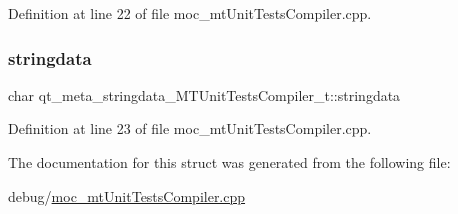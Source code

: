 Definition at line 22 of file moc\+\_\+mt\+Unit\+Tests\+Compiler.\+cpp.

\mbox{\label{structqt__meta__stringdata___m_t_unit_tests_compiler__t_a86fa0a4aa69d55de8577922974d0aea5}} 
\subsubsection{\texorpdfstring{stringdata}{stringdata}}
{\footnotesize\ttfamily char qt\+\_\+meta\+\_\+stringdata\+\_\+\+M\+T\+Unit\+Tests\+Compiler\+\_\+t\+::stringdata}



Definition at line 23 of file moc\+\_\+mt\+Unit\+Tests\+Compiler.\+cpp.



The documentation for this struct was generated from the following file\+:\begin{DoxyCompactItemize}
\item 
debug/\mbox{\hyperlink{debug_2moc__mt_unit_tests_compiler_8cpp}{moc\+\_\+mt\+Unit\+Tests\+Compiler.\+cpp}}\end{DoxyCompactItemize}
